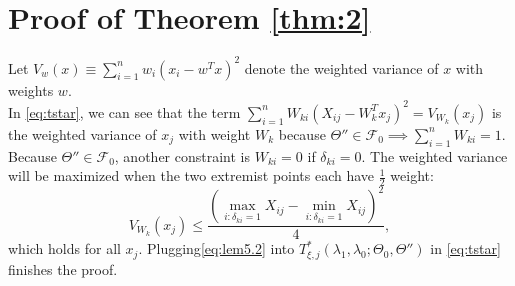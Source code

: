 \section{Proof of Theorem \ref{thm:2}}

    Let $V_{w}(x)\equiv\sum_{i=1}^nw_{i}\left(x_i-w^Tx\right)^2$ denote the weighted variance of $x$ with weights $w$.\\
    In \eqref{eq:tstar}, we can see that the term $\sum_{i=1}^nW_{ki}\left( X_{ij}-W_k^Tx_j\right)^2=V_{W_k}(x_j)$ is the weighted variance of $x_j$ with weight $W_k$ because $\Theta''\in\mathcal{F}_{0}\implies\sum_{i=1}^nW_{ki}=1$. Because $\Theta''\in\mathcal{F}_{0}$, another constraint is $W_{ki}=0$ if $\delta_{ki}=0$. The weighted variance will be maximized when the two extremist points each have $\frac{1}{2}$ weight:
    \begin{equation}
        \label{eq:lem5.2}
        V_{W_k}(x_j)\leq \frac{\left(\max_{i:\delta_{ki}=1}X_{ij}-\min_{i:\delta_{ki}=1}X_{ij}\right)^2}{4},
    \end{equation}
    which holds for all $x_j$. Plugging\eqref{eq:lem5.2} into $T^*_{\xi,j}(\lambda_1,\lambda_0;\Theta_{0},\Theta'')$ in \eqref{eq:tstar} finishes the proof.







